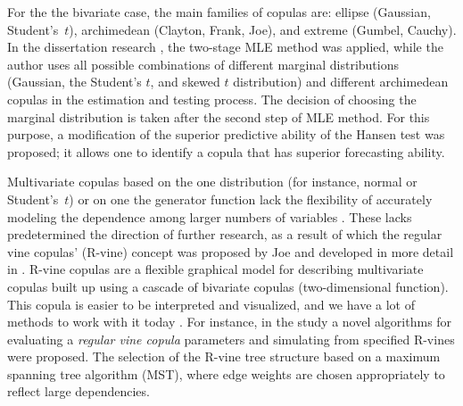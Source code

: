 \documentclass{llncs}
\begin{document}
For the the bivariate case, the main families of copulas are: ellipse (Gaussian,
Student's~$t$), archimedean (Clayton, Frank, Joe), and extreme (Gumbel,
Cauchy). 
%
In the dissertation research \cite{Xu2008}, the two-stage  MLE method
was applied, while the author uses all possible combinations of
different marginal distributions (Gaussian, the Student's $t$, and
skewed $t$ distribution) and different archimedean copulas in the
estimation and testing process. The decision of choosing the
marginal distribution is taken after the second step of MLE
method. For this purpose, a modification of the superior
predictive ability of the Hansen test \cite{Hansen2005} was
proposed; it allows one to identify a copula that has superior
forecasting ability.
%


 Multivariate copulas based on the one distribution (for instance, normal or Student's~$t$) or on one the generator function lack the flexibility of accurately modeling the dependence among larger numbers of variables \cite{Brechmann2013}. These lacks predetermined the direction of further research, as a result of which the regular vine copulas' (R-vine) concept was proposed by Joe \cite{Joe1996} and developed in more detail in \cite{Brechmann2013, Cooke2015}. 
R-vine copulas are a flexible graphical model for describing multivariate copulas built up using
a cascade of bivariate copulas (two-dimensional function). This copula is easier to be interpreted and visualized, and we have a lot of methods to work with it today \cite{Cooke2015, Czado2010, Dissmann2013}. 
%
For instance, in the study \cite{Dissmann2013} a novel algorithms for evaluating
a \emph{regular vine copula} parameters and simulating
from specified R-vines were proposed. The selection of the R-vine
tree structure based on a maximum spanning tree algorithm (MST),
where edge weights are chosen appropriately to reflect large
dependencies.
\end{document}
